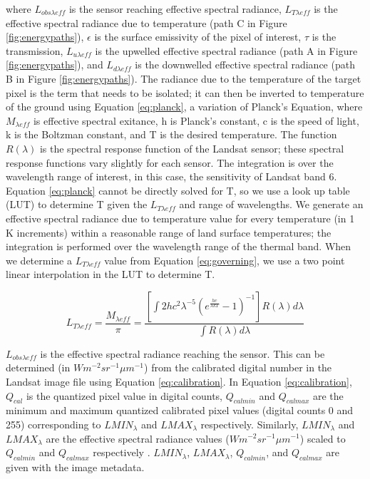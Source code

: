 \documentclass{book}
\begin{document}
where $L_{obs{{\lambda}eff}}$ is the sensor reaching effective spectral radiance, $L_{T{\lambda{eff}}}$ is the effective spectral radiance due to temperature (path C in Figure \ref{fig:energypaths}), $\epsilon$ is the surface emissivity of the pixel of interest, $\tau$ is the transmission, $L_{u{\lambda{eff}}}$ is the upwelled effective spectral radiance (path A in Figure \ref{fig:energypaths}), and $L_{d{\lambda{eff}}}$ is the downwelled effective spectral radiance (path B in Figure \ref{fig:energypaths}).  The radiance due to the temperature of the target pixel is the term that needs to be isolated; it can then be inverted to temperature of the ground using Equation \ref{eq:planck}, a variation of Planck's Equation, where $M_{\lambda{eff}}$ is effective spectral exitance, h is Planck's constant, c is the speed of light, k is the Boltzman constant, and T is the desired temperature. The function $R(\lambda)$ is the spectral response function of the Landsat sensor; these spectral response functions vary slightly for each sensor.  The integration is over the wavelength range of interest, in this case, the sensitivity of Landsat band 6.  Equation \ref{eq:planck} cannot be directly solved for T, so we use a look up table (LUT) to determine T given the $L_{T{\lambda{eff}}}$ and range of wavelengths.  We generate an effective spectral radiance due to temperature value for every temperature (in 1 K increments) within a reasonable range of land surface temperatures; the integration is performed over the wavelength range of the thermal band.  When we determine a $L_{T{\lambda{eff}}}$ value from Equation \ref{eq:governing}, we use a two point linear interpolation in the LUT to determine T.

\begin{equation}
L_{T{{\lambda}eff}} = \frac{M_{\lambda{eff}}}{\pi} = \frac{[\int 2{h}c^2 \lambda^{-5} (e^{\frac{hc}{\lambda kT}}-1)^{-1}]R(\lambda) d\lambda}{\int{R(\lambda)d\lambda}}
\label{eq:planck}
\end{equation}

$L_{obs{{\lambda}eff}}$ is the effective spectral radiance reaching the sensor.  This can be determined (in $Wm^{-2}sr^{-1}\mu{m}^{-1}$) from the calibrated digital number in the Landsat image file using Equation \ref{eq:calibration}.  In Equation \ref{eq:calibration}, $Q_{cal}$ is the quantized pixel value in digital counts, $Q_{calmin}$ and $Q_{calmax}$ are the minimum and maximum quantized calibrated pixel values (digital counts 0 and 255) corresponding to $LMIN_\lambda$ and $LMAX_\lambda$ respectively.  Similarly, $LMIN_\lambda$ and $LMAX_\lambda$ are the effective spectral radiance values ($Wm^{-2}sr^{-1}\mu{m}^{-1}$) scaled to $Q_{calmin}$ and $Q_{calmax}$ respectively \cite{cHander_2003}.  $LMIN_\lambda$, $LMAX_\lambda$, $Q_{calmin}$, and $Q_{calmax}$ are given with the image metadata.  
\end{document}
